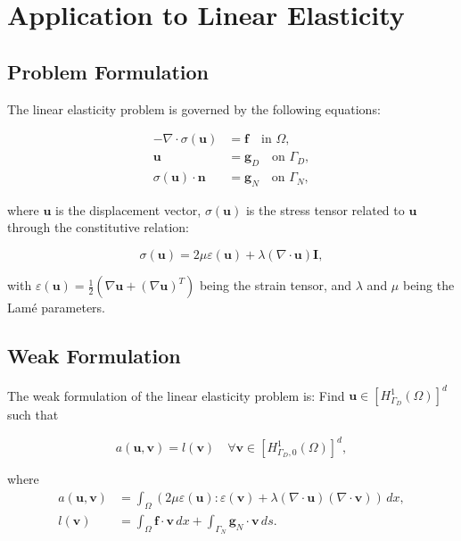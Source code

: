 \documentclass[11pt,a4paper]{article}
\begin{document}
\section{Application to Linear Elasticity}

\subsection{Problem Formulation}

The linear elasticity problem is governed by the following equations:

\begin{align}
-\nabla \cdot \sigma(\mathbf{u}) &= \mathbf{f} \quad \text{in } \Omega, \\
\mathbf{u} &= \mathbf{g}_D \quad \text{on } \Gamma_D, \\
\sigma(\mathbf{u}) \cdot \mathbf{n} &= \mathbf{g}_N \quad \text{on } \Gamma_N,
\end{align}

where $\mathbf{u}$ is the displacement vector, $\sigma(\mathbf{u})$ is the stress tensor related to $\mathbf{u}$ through the constitutive relation:

\begin{equation}
\sigma(\mathbf{u}) = 2\mu \varepsilon(\mathbf{u}) + \lambda (\nabla \cdot \mathbf{u}) \mathbf{I},
\end{equation}

with $\varepsilon(\mathbf{u}) = \frac{1}{2}(\nabla \mathbf{u} + (\nabla \mathbf{u})^T)$ being the strain tensor, and $\lambda$ and $\mu$ being the Lamé parameters.

\subsection{Weak Formulation}

The weak formulation of the linear elasticity problem is: Find $\mathbf{u} \in [H^1_{\Gamma_D}(\Omega)]^d$ such that

\begin{equation}
a(\mathbf{u}, \mathbf{v}) = l(\mathbf{v}) \quad \forall \mathbf{v} \in [H^1_{\Gamma_D,0}(\Omega)]^d,
\end{equation}

where 
\begin{align}
a(\mathbf{u}, \mathbf{v}) &= \int_\Omega (2\mu \varepsilon(\mathbf{u}) : \varepsilon(\mathbf{v}) + \lambda (\nabla \cdot \mathbf{u})(\nabla \cdot \mathbf{v})) \, dx, \\
l(\mathbf{v}) &= \int_\Omega \mathbf{f} \cdot \mathbf{v} \, dx + \int_{\Gamma_N} \mathbf{g}_N \cdot \mathbf{v} \, ds.
\end{align}
\end{document}
